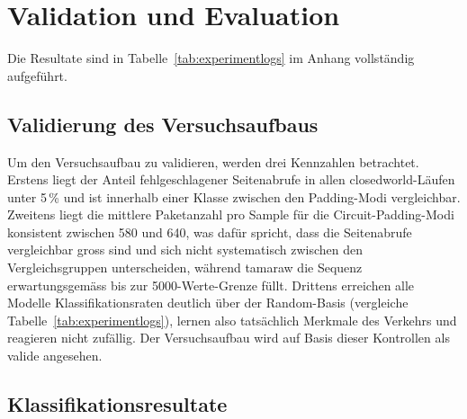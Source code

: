 \chapter{Validation und Evaluation}
\label{cha:diskussion}

Die Resultate sind in Tabelle~\ref{tab:experimentlogs} im Anhang vollständig aufgeführt.

\section{Validierung des Versuchsaufbaus}
\label{sec:eval_validierung}

Um den Versuchsaufbau zu validieren, werden drei Kennzahlen betrachtet.
Erstens liegt der Anteil fehlgeschlagener Seitenabrufe in allen \gls{closedworld}-Läufen unter 5\,\% und ist innerhalb einer Klasse zwischen den Padding-Modi vergleichbar.
Zweitens liegt die mittlere Paketanzahl pro Sample für die Circuit-Padding-Modi konsistent zwischen 580 und 640, was dafür spricht, dass die Seitenabrufe vergleichbar gross sind und sich nicht systematisch zwischen den Vergleichsgruppen unterscheiden, während \gls{tamaraw} die Sequenz erwartungsgemäss bis zur 5000-Werte-Grenze füllt.
Drittens erreichen alle Modelle Klassifikationsraten deutlich über der Random-Basis (vergleiche Tabelle~\ref{tab:experimentlogs}), lernen also tatsächlich Merkmale des Verkehrs und reagieren nicht zufällig.
Der Versuchsaufbau wird auf Basis dieser Kontrollen als valide angesehen.

\section{Klassifikationsresultate}
\label{sec:eval_results}

